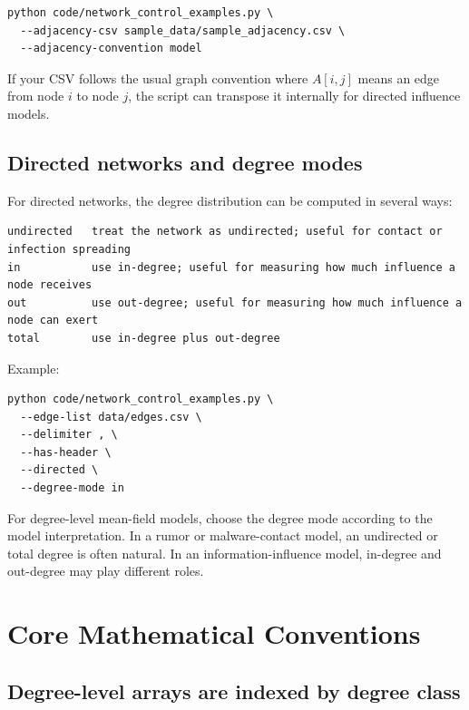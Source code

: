 \documentclass[11pt,a4paper]{article}
\begin{document}
\begin{lstlisting}[style=bash]
python code/network_control_examples.py \
  --adjacency-csv sample_data/sample_adjacency.csv \
  --adjacency-convention model
\end{lstlisting}

If your CSV follows the usual graph convention where \(A[i,j]\) means an edge from node \(i\) to node \(j\), the script can transpose it internally for directed influence models.

\subsection{Directed networks and degree modes}

For directed networks, the degree distribution can be computed in several ways:

\begin{lstlisting}[style=text]
undirected   treat the network as undirected; useful for contact or infection spreading
in           use in-degree; useful for measuring how much influence a node receives
out          use out-degree; useful for measuring how much influence a node can exert
total        use in-degree plus out-degree
\end{lstlisting}

Example:

\begin{lstlisting}[style=bash]
python code/network_control_examples.py \
  --edge-list data/edges.csv \
  --delimiter , \
  --has-header \
  --directed \
  --degree-mode in
\end{lstlisting}

For degree-level mean-field models, choose the degree mode according to the model interpretation. In a rumor or malware-contact model, an undirected or total degree is often natural. In an information-influence model, in-degree and out-degree may play different roles.

\section{Core Mathematical Conventions}

\subsection{Degree-level arrays are indexed by degree class}
\end{document}
